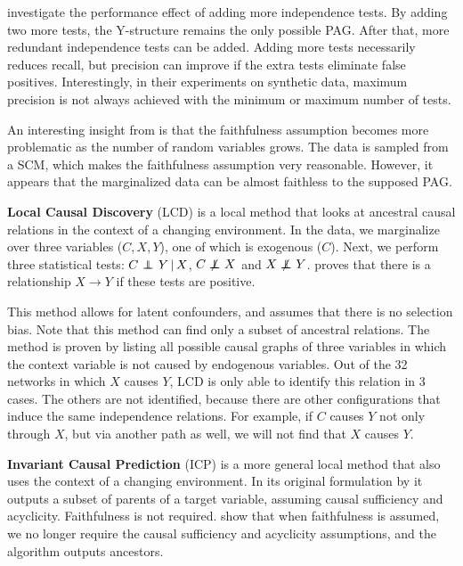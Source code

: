 \citet{mooij2015empirical} investigate the performance effect of adding more independence tests. By adding two more tests, the Y-structure remains the only possible PAG. After that, more redundant independence tests can be added. Adding more tests necessarily reduces recall, but precision can improve if the extra tests eliminate false positives. Interestingly, in their experiments on synthetic data, maximum precision is not always achieved with the minimum or maximum number of tests.

An interesting insight from \citet{mooij2015empirical} is that the faithfulness assumption becomes more problematic as the number of random variables grows. The data is sampled from a SCM, which makes the faithfulness assumption very reasonable. However, it appears that the marginalized data can be almost faithless to the supposed PAG. 

\textbf{Local Causal Discovery} (LCD) is a local method that looks at ancestral causal relations in the context of a changing environment. In the data, we marginalize over three variables ($C, X, Y$), one of which is exogenous ($C$). Next, we perform three statistical tests: ${C} \operatorname*{{\,\perp\mkern-12mu\perp\,}}_{} {Y} \,|\, {X}$, $C \operatorname*{{\,\not\mkern-1mu\perp\mkern-12mu\perp\,}} X$ and $X \operatorname*{{\,\not\mkern-1mu\perp\mkern-12mu\perp\,}} Y$. \citet{cooper1997simple} proves that there is a relationship $X \to Y$ if these tests are positive.

This method allows for latent confounders, and assumes that there is no selection bias. Note that this method can find only a subset of ancestral relations. The method is proven by listing all possible causal graphs of three variables in which the context variable is not caused by endogenous variables. Out of the 32 networks in which $X$ causes $Y$, LCD is only able to identify this relation in 3 cases. The others are not identified, because there are other configurations that induce the same independence relations. For example, if $C$ causes $Y$ not only through $X$, but via another path as well, we will not find that $X$ causes $Y$.  


\textbf{Invariant Causal Prediction} (ICP) is a more general local method that also uses the context of a changing environment. In its original formulation by \citet{peters2016causal} it outputs a subset of parents of a target variable, assuming causal sufficiency and acyclicity. Faithfulness is not required. \citet{mooij2016joint} show that when faithfulness is assumed, we no longer require the causal sufficiency and acyclicity assumptions, and the algorithm outputs ancestors.

